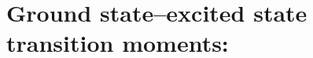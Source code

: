 
\section{Ground state--excited state transition moments: }
\label{sec:cclrsd}

\begin{description}
\item[] 
%
\item[] 
%
\item[] 
%
\item[] 
%
\item[] 
%
\end{description}
